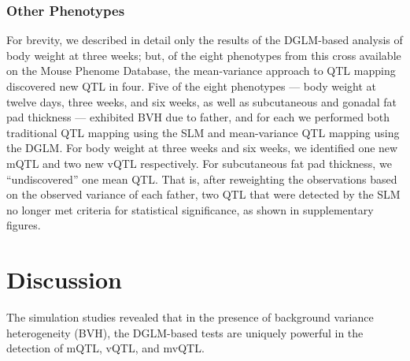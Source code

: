 

    \subsubsection{Other Phenotypes}
    For brevity, we described in detail only the results of the DGLM-based analysis of body weight at three weeks; but, of the eight phenotypes from this cross available on the Mouse Phenome Database, the mean-variance approach to QTL mapping discovered new QTL in four.
    Five of the eight phenotypes --- body weight at twelve days, three weeks, and six weeks, as well as subcutaneous and gonadal fat pad thickness --- exhibited BVH due to father, and for each we performed both traditional QTL mapping using the SLM and mean-variance QTL mapping using the DGLM.
    For body weight at three weeks and six weeks, we identified one new mQTL and two new vQTL respectively.
    For subcutaneous fat pad thickness, we ``undiscovered'' one mean QTL.
    That is, after reweighting the observations based on the observed variance of each father, two QTL that were detected by the SLM no longer met criteria for statistical significance, as shown in supplementary figures.
    

\section{Discussion}

The simulation studies revealed that in the presence of background variance heterogeneity (BVH), the DGLM-based tests are uniquely powerful in the detection of mQTL, vQTL, and mvQTL.


